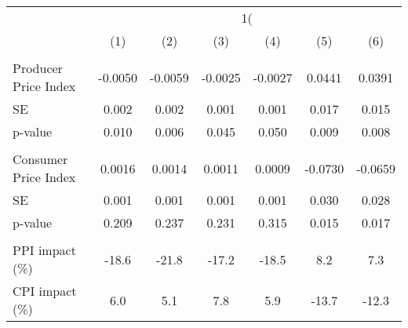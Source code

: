 {
\def\sym#1{\ifmmode^{#1}\else\(^{#1}\)\fi}
\begin{tabular}{l*{6}{c}}
\hline\hline
                    &&&\\\cmidrule(lr){2-3}\cmidrule(lr){4-5}\cmidrule(lr){6-7}
                    &         &         &         &         &         &         \\
\hline
\hline
\\ Producer Price Index&     -0.0050         &     -0.0059         &     -0.0025         &     -0.0027         &      0.0441         &      0.0391         \\
\hspace{15pt} SE    &       0.002         &       0.002         &       0.001         &       0.001         &       0.017         &       0.015         \\
\hspace{15pt} p-value&       0.010         &       0.006         &       0.045         &       0.050         &       0.009         &       0.008         \\
\\ Consumer Price Index&      0.0016         &      0.0014         &      0.0011         &      0.0009         &     -0.0730         &     -0.0659         \\
\hspace{15pt} SE    &       0.001         &       0.001         &       0.001         &       0.001         &       0.030         &       0.028         \\
\hspace{15pt} p-value&       0.209         &       0.237         &       0.231         &       0.315         &       0.015         &       0.017         \\
\hline \\ PPI impact (\%)&       -18.6         &       -21.8         &       -17.2         &       -18.5         &         8.2         &         7.3         \\
CPI impact (\%)     &         6.0         &         5.1         &         7.8         &         5.9         &       -13.7         &       -12.3         \\

\end{tabular}}
